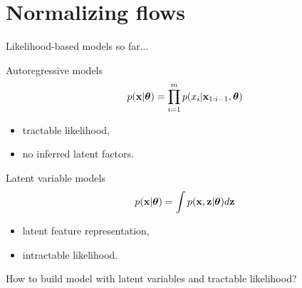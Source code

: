 \section{Normalizing flows}
\begin{frame}{Likelihood-based models so far...}
	\begin{minipage}[t]{0.5\columnwidth}
		\begin{block}{Autoregressive models}
			\vspace{-0.5cm}
			\[
				p(\mathbf{x}|\boldsymbol{\theta}) = \prod_{i=1}^m p(x_i | \mathbf{x}_{1:i - 1}, \boldsymbol{\theta})
			\]
			\vspace{-0.2cm}
			\begin{itemize}
				\item tractable likelihood, 
				\item no inferred latent factors.
			\end{itemize}
		\end{block}
	\end{minipage}%
	\begin{minipage}[t]{0.5\columnwidth}
		\begin{block}{Latent variable models}
			\[
				p(\mathbf{x}| \boldsymbol{\theta}) = \int p(\mathbf{x}, \mathbf{z} | \boldsymbol{\theta}) d \mathbf{z}
			\]
			\begin{itemize}
				\item latent feature representation, 
				\item intractable likelihood.
			\end{itemize}
		\end{block}
	\end{minipage}
	
	\vspace{1cm } 
	How to build model with latent variables and tractable likelihood?
\end{frame}
